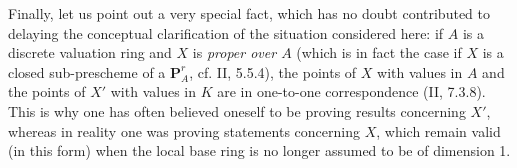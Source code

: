 \begin{env}[3.7.3]
\label{I.3.7.3}
Finally, let us point out a very special fact, which has no doubt contributed
to delaying the conceptual clarification of the situation considered here: if
$A$ is a discrete valuation ring and $X$ is \emph{proper over $A$}
(which is in fact the case if $X$ is a closed sub-prescheme of a
$\mathbf{P}_A^r$, cf. II, 5.5.4), the points of $X$ with values in $A$ and the
points of $X'$ with values in $K$ are in one-to-one correspondence
(II, 7.3.8). This is why one has often believed oneself to be proving results
concerning $X'$, whereas in reality one was proving statements concerning
$X$, which remain valid (in this form) when the local base ring is no longer
assumed to be of dimension 1.
\end{env}
